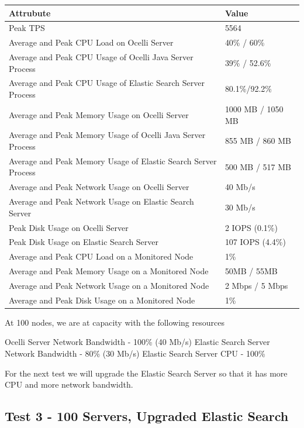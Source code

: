\documentclass{llncs}
\begin{document}
\begin{flushleft}
    \begin{tabular}{ | l | l |}
    \hline
  Attrubute & Value  \\ \hline
  Peak TPS & 5564  \\ \hline
  Average and Peak CPU Load on Ocelli Server &40\% / 60\%  \\ \hline
  Average and Peak CPU Usage of Ocelli Java Server Process & 39\% / 52.6\% \\ \hline
 Average and Peak CPU Usage of Elastic Search Server Process & 80.1\%/92.2\%	  \\ \hline
  Average and Peak Memory Usage on Ocelli Server & 1000 MB / 1050 MB	 \\ \hline
  Average and Peak Memory Usage of Ocelli Java Server Process &	855 MB / 860 MB		 \\ \hline
 Average and Peak Memory Usage of Elastic Search Server Process &	500 MB / 517 MB		 \\ \hline
Average and Peak Network Usage on Ocelli Server &	40 Mb/s 	 \\ \hline
Average and Peak Network Usage on Elastic Search Server & 30 Mb/s 	 \\ \hline
Peak Disk Usage on Ocelli Server &	2 IOPS (0.1\%)		 \\ \hline
Peak Disk Usage on Elastic Search Server &	107 IOPS (4.4\%)		 \\ \hline
Average and Peak CPU Load on a Monitored Node& 	1\% 	 \\ \hline
  Average and Peak Memory Usage on a Monitored Node &	50MB / 55MB	 \\ \hline
Average and Peak Network Usage on a Monitored Node &	2 Mbps / 5 Mbps		 \\ \hline
  Average and Peak Disk Usage on a Monitored Node &  1\%	\\ 
    \hline
    \end{tabular}
\end{flushleft}

At 100 nodes, we are at capacity with the following resources

Ocelli Server Network Bandwidth - 100\% (40 Mb/s)
Elastic Search Server Network Bandwidth - 80\% (30 Mb/s)
Elastic Search Server CPU - 100\%

For the next test we will upgrade the Elastic Search Server so that it has more CPU and more network bandwidth.

\subsection{Test 3 - 100 Servers, Upgraded Elastic Search}
\end{document}
